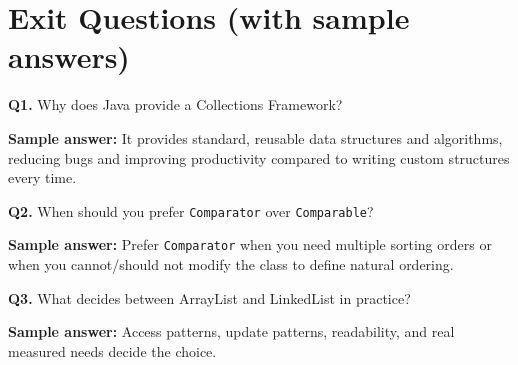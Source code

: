 \documentclass[11pt]{article}
\begin{document}
\section{Exit Questions (with sample answers)}
\textbf{Q1.} Why does Java provide a Collections Framework?\par
\textbf{Sample answer:} It provides standard, reusable data structures and algorithms, reducing bugs and improving productivity compared to writing custom structures every time.

\vspace{0.6em}
\textbf{Q2.} When should you prefer \texttt{Comparator} over \texttt{Comparable}?\par
\textbf{Sample answer:} Prefer \texttt{Comparator} when you need multiple sorting orders or when you cannot/should not modify the class to define natural ordering.

\vspace{0.6em}
\textbf{Q3.} What decides between ArrayList and LinkedList in practice?\par
\textbf{Sample answer:} Access patterns, update patterns, readability, and real measured needs decide the choice.
\end{document}
